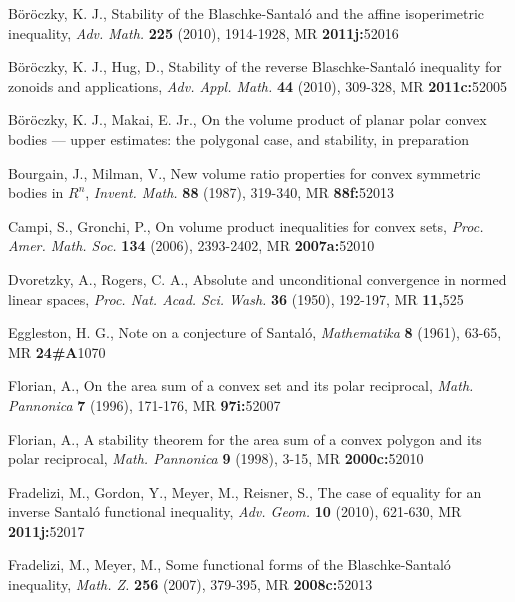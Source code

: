 \documentclass[12pt]{article}
\begin{document}
\begin{thebibliography}{999999}
B\"or\"oczky, K. J.,
Stability of the Blaschke-Santal\'o and the affine isoperimetric
inequality,
{\it{Adv. Math.}} {\bf{225}} (2010), 1914-1928,
MR {\bf{2011j:}}{\rm{52016}}

B\"or\"oczky, K. J., Hug, D.,
Stability of the reverse Blaschke-Santal\'o inequality for zonoids and
applications, {\it{Adv. Appl. Math.}} {\bf{44}} (2010), 309-328,
MR {\bf{2011c:}}{\rm{52005}}

B\"or\"oczky, K. J., Makai, E. Jr.,
On the volume product of planar polar convex bodies ---
upper estimates: the polygonal case, and stability, in preparation

Bourgain, J., Milman, V.,
New volume ratio properties for convex symmetric bodies in $R^n$,
{\it{Invent. Math.}} {\bf{88}} (1987), 319-340, MR {\bf{88f:}}{\rm{52013}}

Campi, S., Gronchi, P.,
On volume product inequalities for convex sets,
{\it{Proc. Amer. Math. Soc.}} {\bf{134}} (2006), 2393-2402,
MR {\bf{2007a:}}{\rm{52010}}

Dvoretzky, A., Rogers, C. A.,
Absolute and unconditional convergence in normed linear spaces,
{\it{Proc. Nat. Acad. Sci. Wash.}} {\bf{36}} (1950), 192-197,
MR {\bf{11,}}{\rm{525}}

Eggleston, H. G.,
Note on a conjecture of Santal\'o,
{\it{Mathematika}} {\bf{8}} (1961), 63-65, MR {\bf{24\#A}}{\rm{1070}}

Florian, A.,
On the area sum of a convex set and its polar reciprocal,
{\it{Math. Pannonica}} {\bf{7}} (1996), 171-176, MR {\bf{97i:}}{\rm{52007}}

Florian, A.,
A stability theorem for the area sum of a convex polygon 
and its polar reciprocal,
{\it{Math. Pannonica}} {\bf{9}} (1998), 3-15, MR {\bf{2000c:}}{\rm{52010}}

Fradelizi, M., Gordon, Y., Meyer, M., Reisner, S.,
The case of equality for an inverse Santal\'o functional inequality,
{\it{Adv. Geom.}} {\bf{10}} (2010), 621-630,
MR {\bf{2011j:}}{\rm{52017}} 

Fradelizi, M., Meyer, M.,
Some functional forms of the Blaschke-Santal\'o inequality,
{\it{Math. Z.}} {\bf{256}} (2007), 379-395, MR {\bf{2008c:}}{\rm{52013}} 


\end{thebibliography}
\end{document}
